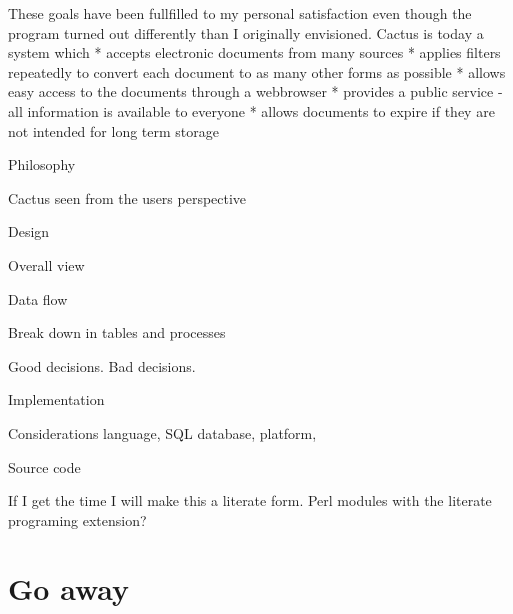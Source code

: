    These goals have been fullfilled to my personal satisfaction even
   though the program turned out differently than I originally
   envisioned. Cactus is today a system which
     * accepts electronic documents from many sources
     * applies filters repeatedly to convert each document to as many
       other forms as possible
     * allows easy access to the documents through a webbrowser
     * provides a public service - all information is available to
       everyone
     * allows documents to expire if they are not intended for long term
       storage


   Philosophy




   Cactus seen from the users perspective


   Design

   Overall view

   Data flow

   Break down in tables and processes

   Good decisions. Bad decisions.


   Implementation

   Considerations language, SQL database, platform,


   Source code

   If I get the time I will make this a literate form. Perl modules with
   the literate programing extension?







\chapter{Go away}








